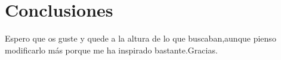 \documentclass[a4paper,12pt]{article}
\begin{document}
\section{Conclusiones}\label{sec:concl}
Espero que os guste y quede a la  altura de lo que buscaban,aunque pienso
modificarlo  más porque me ha inspirado bastante.Gracias.

\newpage

\tableofcontents
\end{document}
